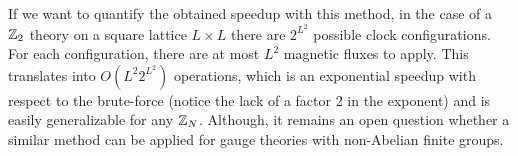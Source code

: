If we want to quantify the obtained speedup with this method, in the case of a $\mathbb{Z}_2$ theory on a square lattice $L \times L$ there are $2^{L^2}$ possible clock configurations.
For each configuration, there are at most $L^2$ magnetic fluxes to apply.
This translates into $O(L^2 2^{L^2})$ operations, which is an exponential speedup with respect to the brute-force (notice the lack of a factor 2 in the exponent) and is easily generalizable for any $\mathbb{Z}_N$.
Although, it remains an open question whether a similar method can be applied for gauge theories with non-Abelian finite groups.





%     
